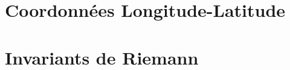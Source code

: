 \documentclass[11pt]{thesul}
\begin{document}




 




\Annexes

\section{Coordonnées Longitude-Latitude}

\section{Invariants de Riemann}






\end{document}
